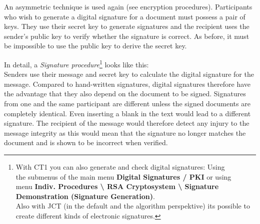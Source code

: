 \begin{bibunit}[babalpha]
An asymmetric technique is used again (see encryption procedures). Participants
who wish to generate a digital signature for a document must possess a pair of
keys. They use their secret key to generate signatures and the recipient uses
the sender's public key to verify whether the signature is correct. As before,
it must be impossible to use the public key to derive the secret key.


In detail, a  {\em Signature procedure}\footnote{%
With CT1 you can also generate and check 
digital signatures: Using\\
the submenus of the main menu {\bf Digital Signatures / PKI}  or using\\
menu {\bf Indiv. Procedures \textbackslash{} RSA Cryptosystem 
\textbackslash{} Signature Demonstration (Signature Generation)}.\\
Also with JCT (in the default and the algorithm perspektive)
its possible to create different kinds of electronic signatures.
} looks like
this:\\ Senders use their message and secret key to calculate the digital
signature for the message. Compared to hand-written signatures, digital
signatures therefore have the advantage that they also depend on the document to
be signed. Signatures from one and the same participant are different unless the
signed documents are completely identical. Even inserting a blank in the text
would lead to a different signature. The recipient of the message would
therefore detect any injury to the message integrity as this would mean that the
signature no longer matches the document and is shown to be incorrect when
verified.


\end{bibunit}

